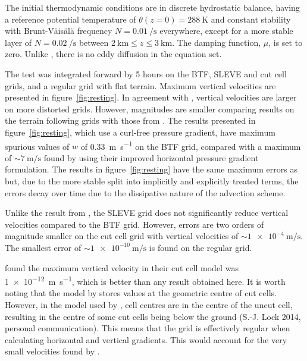 \documentclass[draft]{ametsoc}
\begin{document}
The initial thermodynamic conditions are in discrete hydrostatic balance, having a reference potential temperature of $\theta(z = 0) = \SI{288}{\kelvin}$ and constant stability with Brunt-V\"ais\"al\"a frequency $N = \SI{0.01}{\per\second}$ everywhere, except for a more stable layer of $N = \SI{0.02}{\per\second}$ between $\SI{2}{\kilo\meter} \leq z \leq \SI{3}{\kilo\meter}$.  The damping function, \(\mu\), is set to zero.  Unlike \citet{klemp2011}, there is no eddy diffusion in the equation set.

The test was integrated forward by 5 hours on the BTF, SLEVE and cut cell grids, and a regular grid with flat terrain.  Maximum vertical velocities are presented in figure~\ref{fig:resting}.  In agreement with \citet{klemp2011}, vertical velocities are larger on more distorted grids.  However, magnitudes are smaller comparing results on the terrain following grids with those from \citet{klemp2011}.  
The results presented in figure~\ref{fig:resting}, which use a curl-free pressure gradient, have maximum spurious values of $w$ of \SI{0.33}{\meter\per\second} on the BTF grid, compared with a maximum of \(\sim \SI{7}{\meter\per\second}\) found by \citet{klemp2011} using their improved horizontal pressure gradient formulation.
The results in figure~\ref{fig:resting} have the same maximum errors as \citet{weller-shahrokhi2014} but, due to the more stable split into implicitly and explicitly treated terms, the errors decay over time due to the dissipative nature of the advection scheme.

Unlike the result from \citet{klemp2011}, the SLEVE grid does not significantly reduce vertical velocities compared to the BTF grid.  However, errors are two orders of magnitude smaller on the cut cell grid with vertical velocities of \(\sim \SI{1e-4}{\meter\per\second}\).  The smallest error of \(\sim \SI{1e-10}{\meter\per\second}\) is found on the regular grid.

\citet{good2014} found the maximum vertical velocity in their cut cell model was \SI{1e-12}{\meter\per\second}, which is better than any result obtained here.  It is worth noting that the model by \citet{weller-shahrokhi2014} stores values at the geometric centre of cut cells.  However, in the model used by \citet{good2014}, cell centres are in the centre of the uncut cell, resulting in the centre of some cut cells being below the ground (S.-J. Lock 2014, personal communication).  This means that the grid is effectively regular when calculating horizontal and vertical gradients.  This would account for the very small velocities found by \citet{good2014}.
\end{document}
